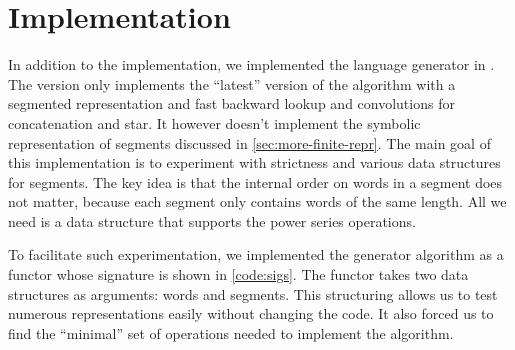 \section{\ocaml Implementation}
\label{sec:ocaml}

\lstset{language=[Objective]Caml}

In addition to the \haskell implementation, we implemented the language generator
in \ocaml.
The \ocaml version only implements the ``latest'' version of the
algorithm with a segmented representation and fast backward lookup and convolutions
for concatenation and star.
It however doesn't implement the symbolic representation of segments
discussed in \cref{sec:more-finite-repr}.
The main goal of this implementation is to experiment with strictness
and various data structures for segments. 
The key idea is that the internal order on words in a segment does not matter,
because each segment only contains words of the same length.
All we need is a data structure that supports the power series
operations.

To facilitate such experimentation, we implemented the generator
algorithm as a functor whose signature is shown in \cref{code:sigs}.
The functor takes two data structures as arguments: words and segments.
This structuring allows us to test numerous representations easily without changing
the code. It also forced us to find the ``minimal'' set of operations
needed to implement the algorithm.

